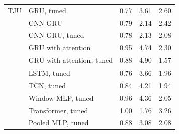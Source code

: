 \begin{tabular}{llrrr}
TJU & GRU, tuned & 0.77 & 3.61 & 2.60 \\
 & CNN-GRU & 0.79 & 2.14 & 2.42 \\
 & CNN-GRU, tuned & 0.78 & 2.13 & 2.08 \\
 & GRU with attention & 0.95 & 4.74 & 2.30 \\
 & GRU with attention, tuned & 0.88 & 4.90 & 1.57 \\
 & LSTM, tuned & 0.76 & 3.66 & 1.96 \\
 & TCN, tuned & 0.84 & 4.21 & 1.94 \\
 & Window MLP, tuned & 0.96 & 4.36 & 2.05 \\
 & Transformer, tuned & 1.00 & 1.76 & 3.26 \\
 & Pooled MLP, tuned & 0.88 & 3.08 & 2.08 \\
\bottomrule
\end{tabular}

